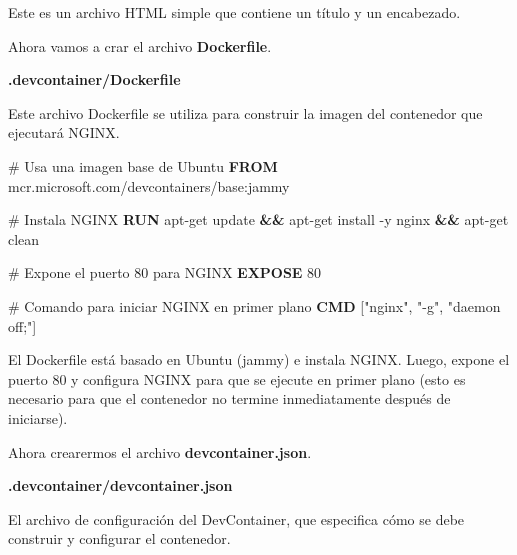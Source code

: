 \documentclass[
  a4paper,
  DIV=11,
  numbers=noendperiod,
  onepage,
  openany]{scrreprt}
\newenvironment{Shaded}{\begin{snugshade}}{\end{snugshade}}
\newcommand{\AttributeTok}[1]{\textcolor[rgb]{0.40,0.45,0.13}{#1}}
\newcommand{\CommentTok}[1]{\textcolor[rgb]{0.37,0.37,0.37}{#1}}
\newcommand{\DataTypeTok}[1]{\textcolor[rgb]{0.68,0.00,0.00}{#1}}
\newcommand{\DecValTok}[1]{\textcolor[rgb]{0.68,0.00,0.00}{#1}}
\newcommand{\ExtensionTok}[1]{\textcolor[rgb]{0.00,0.23,0.31}{#1}}
\newcommand{\FunctionTok}[1]{\textcolor[rgb]{0.28,0.35,0.67}{#1}}
\newcommand{\KeywordTok}[1]{\textcolor[rgb]{0.00,0.23,0.31}{\textbf{#1}}}
\newcommand{\NormalTok}[1]{\textcolor[rgb]{0.00,0.23,0.31}{#1}}
\newcommand{\OtherTok}[1]{\textcolor[rgb]{0.00,0.23,0.31}{#1}}
\newcommand{\StringTok}[1]{\textcolor[rgb]{0.13,0.47,0.30}{#1}}
\begin{document}
Este es un archivo HTML simple que contiene un título y un encabezado.

Ahora vamos a crar el archivo \textbf{Dockerfile}.

\textbf{.devcontainer/Dockerfile}

Este archivo Dockerfile se utiliza para construir la imagen del
contenedor que ejecutará NGINX.

\begin{Shaded}
\begin{Highlighting}[]
\CommentTok{\# Usa una imagen base de Ubuntu}
\KeywordTok{FROM}\NormalTok{ mcr.microsoft.com/devcontainers/base:jammy}

\CommentTok{\# Instala NGINX}
\KeywordTok{RUN} \ExtensionTok{apt{-}get}\NormalTok{ update }\KeywordTok{\&\&} \ExtensionTok{apt{-}get}\NormalTok{ install }\AttributeTok{{-}y}\NormalTok{ nginx }\KeywordTok{\&\&} \ExtensionTok{apt{-}get}\NormalTok{ clean}

\CommentTok{\# Expone el puerto 80 para NGINX}
\KeywordTok{EXPOSE}\NormalTok{ 80}

\CommentTok{\# Comando para iniciar NGINX en primer plano}
\KeywordTok{CMD}\NormalTok{ [}\StringTok{"nginx"}\NormalTok{, }\StringTok{"{-}g"}\NormalTok{, }\StringTok{"daemon off;"}\NormalTok{]}
\end{Highlighting}
\end{Shaded}

El Dockerfile está basado en Ubuntu (jammy) e instala NGINX. Luego,
expone el puerto 80 y configura NGINX para que se ejecute en primer
plano (esto es necesario para que el contenedor no termine
inmediatamente después de iniciarse).

Ahora crearermos el archivo \textbf{devcontainer.json}.

\textbf{.devcontainer/devcontainer.json}

El archivo de configuración del DevContainer, que especifica cómo se
debe construir y configurar el contenedor.

\begin{Shaded}
\end{Shaded}
\end{document}
